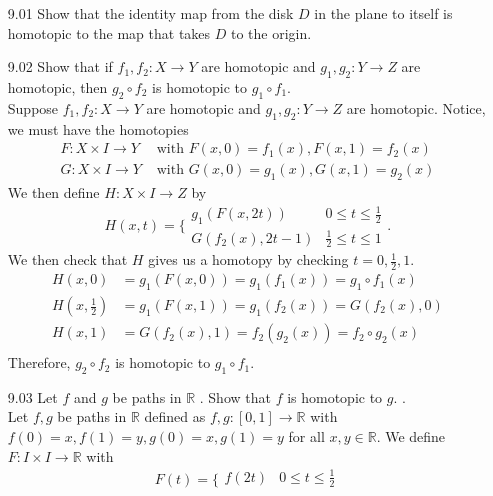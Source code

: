 \documentclass[12pt]{article}
\newcommand{\R}{\mathbb{R}}
\begin{document}
	\pagestyle{fancy}  
	\lfoot{} \cfoot{} \rfoot{}
	
	\begin{enumerate}
		\item[9.01] Show that the identity map from the disk $D$ in the plane to itself is homotopic to the map that takes $D$ to the origin.
		
		\item[9.02] Show that if $f _ { 1 } , f _ { 2 } : X \rightarrow Y$ are homotopic and $g _ { 1 } , g _ { 2 } : Y \rightarrow Z$ are homotopic,
		then $g _ { 2 } \circ f _ { 2 }$ is homotopic to $g _ { 1 } \circ f _ { 1 } .$\\
		Suppose  $f _ { 1 } , f _ { 2 } : X \rightarrow Y$ are homotopic and $g _ { 1 } , g _ { 2 } : Y \rightarrow Z$ are homotopic. Notice, we must have the homotopies
			\begin{align*}
				F : X\times I \rightarrow Y &\text{ with } F(x,0) = f_1(x), F(x,1)=f_2(x)\\
				G : X\times I \rightarrow Y &\text{ with } G(x,0) = g_1(x), G(x,1)=g_2(x)
			\end{align*}
		We then define $ H:X\times I \rightarrow Z $ by
			\[H(x,t) = \{\begin{array}{ll}
				{g_1(F(x,2t))} & {0 \leq t \leq \frac{1}{2}} \\
				{G(f_2(x),2t-1)} & {\frac{1}{2} \leq t \leq 1 }
			 \end{array}.\]
		We then check that $ H $ gives us a homotopy by checking $ t=0,\frac{1}{2},1 $.
			\begin{align*}
			H(x,0) &= g_1(F(x,0)) = g_1(f_1(x))=g_1\circ f_1 (x)\\
			H(x,\frac{1}{2}) &= g_1(F(x,1)) = g_1(f_2(x))=G(f_2(x),0)\\
			H(x,1) &= G(f_2(x),1) = f_2(g_2(x))=f_2\circ g_2 (x)\\
			\end{align*}
		Therefore, $g _ { 2 } \circ f _ { 2 }$ is homotopic to $g _ { 1 } \circ f _ { 1 } .$
		\item[9.03] Let $f$ and $g$ be paths in $\mathbb { R }$ . Show that $f$ is homotopic to $g .$ .\\
		Let $ f,g $ be paths in $ \R $ defined as $ f,g : [0,1]\rightarrow \R $ with $ f(0)=x, f(1)=y, g(0)=x,g(1)=y$ for all $ x,y\in\R $.
		We define $ F:I\times I \rightarrow \R $ with 	
		\[F(t) = \{\begin{array}{ll}
			{f(2t)} & {0 \leq t \leq \frac{1}{2}} \\

\end{array}\]
\end{enumerate}
\end{document}
